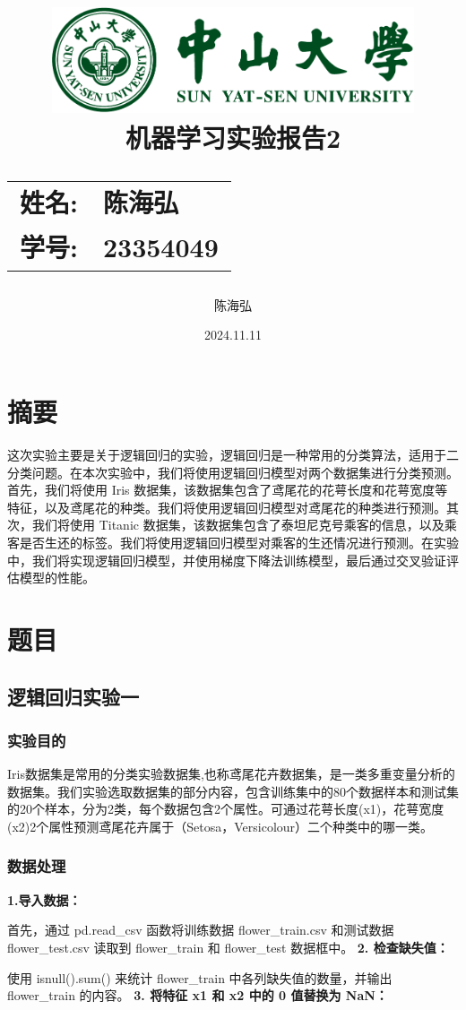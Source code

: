\documentclass[12pt,a4paper,oneside]{article}
\date{\Large 2024.11.11}
\author{陈海弘}
\title{
    \vspace*{-2cm}
    \includegraphics[width=0.8\textwidth]{SYSULogo.pdf} \\[1em]
    \vfill
    \LARGE \textbf{机器学习实验报告2} \\[1em]
    \Large
    \begin{tabular}{rl}
        \textbf{姓名:} & \textbf{陈海弘} \\
        \textbf{学号:} & \textbf{23354049}
    \end{tabular}
    \vfill
}
\begin{document}
\maketitle
\newpage
\tableofcontents

\newpage
\section{摘要}
    \qquad 这次实验主要是关于逻辑回归的实验，逻辑回归是一种常用的分类算法，适用于二分类问题。在本次实验中，我们将使用逻辑回归模型对两个数据集进行分类预测。首先，我们将使用 Iris 数据集，该数据集包含了鸢尾花的花萼长度和花萼宽度等特征，以及鸢尾花的种类。我们将使用逻辑回归模型对鸢尾花的种类进行预测。其次，我们将使用 Titanic 数据集，该数据集包含了泰坦尼克号乘客的信息，以及乘客是否生还的标签。我们将使用逻辑回归模型对乘客的生还情况进行预测。在实验中，我们将实现逻辑回归模型，并使用梯度下降法训练模型，最后通过交叉验证评估模型的性能。
\section{题目}
\subsection{逻辑回归实验一}
\subsubsection{实验目的}
\qquad Iris数据集是常用的分类实验数据集,也称鸢尾花卉数据集，是一类多重变量分析的数据集。我们实验选取数据集的部分内容，包含训练集中的80个数据样本和测试集的20个样本，分为2类，每个数据包含2个属性。可通过花萼长度(x1)，花萼宽度(x2)2个属性预测鸢尾花卉属于（Setosa，Versicolour）二个种类中的哪一类。

\subsubsection{数据处理}

\textbf{1.导入数据：}

首先，通过 pd.read\_csv 函数将训练数据 flower\_train.csv 和测试数据 flower\_test.csv 读取到 flower\_train 和 flower\(\)\_test 数据框中。
\newline \textbf{2.	检查缺失值：}

使用 isnull().sum() 来统计 flower\_train 中各列缺失值的数量，并输出 flower\_train 的内容。
\newline \textbf{3.	将特征 x1 和 x2 中的 0 值替换为 NaN：}
\end{document}
